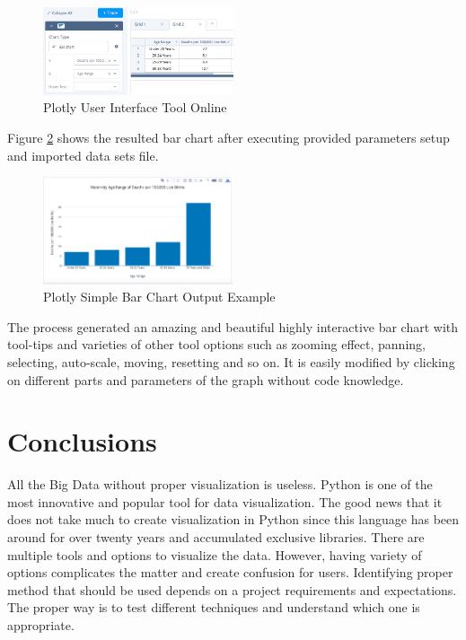 \documentclass[sigconf]{acmart}
\begin{document}
\begin{figure}
  \centering
  \includegraphics[width=0.5\textwidth]{images/output_7.png}
  \caption{Plotly User Interface Tool Online } \label{fig:figure9} 
\end{figure}

Figure  \ref{fig:figure10} shows the resulted bar chart after executing provided parameters setup and imported data sets file.

\begin{figure}
  \centering
  \includegraphics[width=0.5\textwidth]{images/output_6_0.png}
  \caption{Plotly Simple Bar Chart Output Example } \label{fig:figure10} 
\end{figure}

The process generated an amazing and beautiful highly interactive bar chart with tool-tips and varieties of other tool options such as zooming effect, panning, selecting, auto-scale, moving, resetting and so on. It is easily modified by clicking on different parts and parameters of the graph without code knowledge. 


\section{Conclusions}

All the Big Data without proper visualization is useless. Python is one of the most innovative and popular tool for data visualization. The good news that it does not take much to create visualization in Python since this language has been around for over twenty years and accumulated exclusive libraries. There are multiple tools and options to visualize the data. However, having variety of options complicates the matter and create confusion for users. Identifying proper method that should be used depends on a project requirements and expectations. The proper way is to test different techniques and understand which one is appropriate. 
\end{document}
